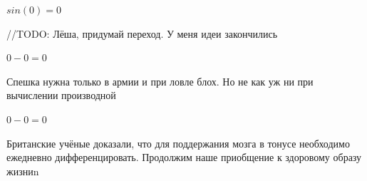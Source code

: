 \documentclass[12pt,a4paper,fleqn]{article}
\begin{document}
\begin{center}
\begin{center}
\begin{center}
\begin{center}
\begin{center}
\begin{center}
\begin{center}
\begin{center}
\begin{center}
\begin{center}
\begin{center}
\begin{center}
\begin{center}
\begin{center}
\begin{center}
\begin{center}
\begin{center}
\begin{center}
\begin{center}
\begin{center}
\begin{center}
\begin{center}
\begin{center}
\begin{center}
\begin{center}
\begin{center}
\begin{center}
\begin{center}
\begin{center}
\begin{center}
\begin{center}
\begin{center}
\begin{center}
\begin{center}
\begin{center}
\begin{center}
\begin{center}
\begin{center}
\begin{center}
\begin{center}
\begin{center}
\begin{center}
\begin{center}
\begin{center}
\begin{center}
\begin{center}
\begin{center}
\begin{center}
\begin{center}
\begin{center}
\begin{center}
\begin{center}
\begin{center}
\begin{center}
\begin{center}
\begin{center}
\begin{center}
\begin{center}
\begin{center}
\begin{center}
\begin{center}
\begin{center}
\begin{center}
\begin{center}
\begin{center}
\begin{center}
\begin{center}
\begin{center}
\begin{center}
\begin{center}
\begin{center}
\begin{center}
\begin{center}
\begin{center}
\begin{center}
\begin{center}
\begin{center}
\begin{center}
\begin{center}
\begin{center}
\begin{center}
\begin{center}
\begin{center}
\begin{center}
\begin{center}
\begin{center}
\begin{center}$sin(0) = 0$\end{center}
//TODO: Лёша, придумай переход. У меня идеи закончились

\begin{center}
\begin{center}$0-0 = 0$\end{center}
Спешка нужна только в армии и при ловле блох. Но не как уж ни при вычислении производной\cite{link2}

\begin{center}
\begin{center}$0-0 = 0$\end{center}
Британские учёные доказали, что для поддержания мозга в тонусе необходимо ежедневно дифференцировать. Продолжим наше приобщение к здоровому образу жизниn


\end{center}
\end{center}
\end{center}
\end{center}
\end{center}
\end{center}
\end{center}
\end{center}
\end{center}
\end{center}
\end{center}
\end{center}
\end{center}
\end{center}
\end{center}
\end{center}
\end{center}
\end{center}
\end{center}
\end{center}
\end{center}
\end{center}
\end{center}
\end{center}
\end{center}
\end{center}
\end{center}
\end{center}
\end{center}
\end{center}
\end{center}
\end{center}
\end{center}
\end{center}
\end{center}
\end{center}
\end{center}
\end{center}
\end{center}
\end{center}
\end{center}
\end{center}
\end{center}
\end{center}
\end{center}
\end{center}
\end{center}
\end{center}
\end{center}
\end{center}
\end{center}
\end{center}
\end{center}
\end{center}
\end{center}
\end{center}
\end{center}
\end{center}
\end{center}
\end{center}
\end{center}
\end{center}
\end{center}
\end{center}
\end{center}
\end{center}
\end{center}
\end{center}
\end{center}
\end{center}
\end{center}
\end{center}
\end{center}
\end{center}
\end{center}
\end{center}
\end{center}
\end{center}
\end{center}
\end{center}
\end{center}
\end{center}
\end{center}
\end{center}
\end{center}
\end{center}
\end{center}
\end{center}
\end{document}
